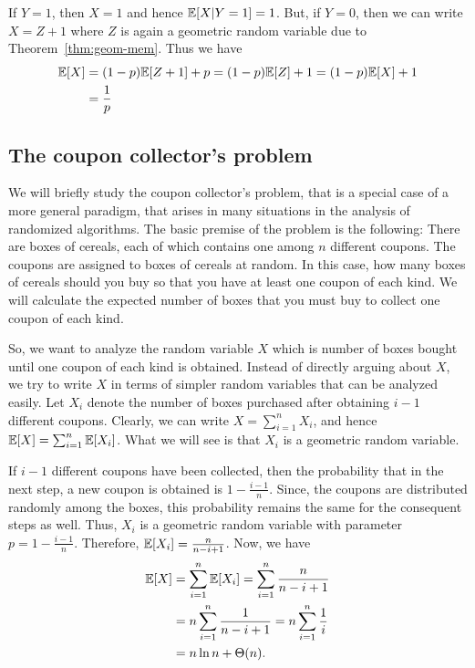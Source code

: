 If $Y=1$, then $X=1$ and hence $\mathbb{E}[X|Y=1] =1$. But, if $Y=0$, then we can write $X = Z+1$ where $Z$ is again a geometric random variable due to Theorem~\ref{thm:geom-mem}. Thus we have
\begin{align*}
	\mathbb{E}[X] &= (1-p)\mathbb{E}[Z+1] + p = (1-p)\mathbb{E}[Z] + 1 = (1-p)\mathbb{E}[X] +1\\
	&=\frac{1}{p}
\end{align*}

\subsection{The coupon collector's problem}

We will briefly study the coupon collector's problem, that is a special case of a more general paradigm, that arises in many situations in the analysis of randomized algorithms. The basic premise of the problem is the following: There are boxes of cereals, each of which contains one among $n$ different coupons. The coupons are assigned to boxes of cereals at random. In this case, how many boxes of cereals should you buy so that you have at least one coupon of each kind. We will calculate the expected number of boxes that you must buy to collect one coupon of each kind.

So, we want to analyze the random variable $X$ which is number of boxes bought until one coupon of each kind is obtained. Instead of directly arguing about $X$, we try to write $X$ in terms of simpler random variables that can be analyzed easily. Let $X_i$ denote the number of boxes purchased after obtaining $i-1$ different coupons. Clearly, we can write $X = \sum_{i=1}^{n} X_i$, and hence $\mathbb{E}[X] = \sum_{i=1}^n \mathbb{E}[X_i]$. What we will see is that $X_i$ is a geometric random variable.

If $i-1$ different coupons have been collected, then the probability that in the next step, a new coupon is obtained is $1-\frac{i-1}{n}$. Since, the coupons are distributed randomly among the boxes, this probability remains the same for the consequent steps as well. Thus, $X_i$ is a geometric random variable with parameter $p = 1 - \frac{i-1}{n}$. Therefore, $\mathbb{E}[X_i] = \frac{n}{n-i+1}$. Now, we have
\begin{align*}
	\mathbb{E}[X] &= \sum_{i=1}^n \mathbb{E}[X_i] = \sum_{i=1}^n \frac{n}{n-i+1}\\
	&= n \sum_{i=1}^n \frac{1}{n-i+1} = n\sum_{i=1}^n \frac{1}{i}\\
	&= n\ln n+ \Theta(n).
\end{align*}

